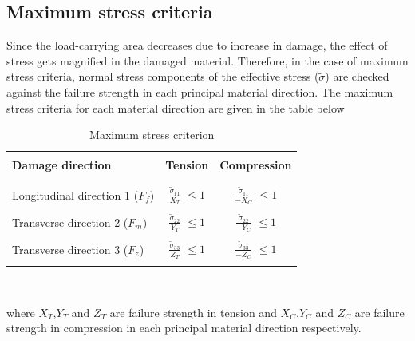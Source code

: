 \documentclass[12pt,openright,twoside]{report}
\begin{document}
\subsection{Maximum stress criteria}\label{Maximum stress criteria}
\indent\indent\indent  Since the load-carrying area decreases due to increase in damage, the effect of stress gets magnified in the damaged material. Therefore, in the case of maximum stress criteria, normal stress components of the effective stress ($\tilde{\sigma}$) are checked against the failure strength in each principal material direction. The maximum stress criteria \citep{jiang2018evaluations} for each material direction are given in the table below 
\begin{table}[htbp]
  \begin{center}
     \begin{tabular}{l  c  c} 
     \hline
     \\
      \textbf{Damage direction} \;\;& \textbf{Tension} \;& \textbf{Compression}\\
      \\
      \hline
      \\
      Longitudinal direction 1 ($F_{f}$) & \Large{$\frac{\tilde{\sigma}_{11}}{X_{T}} $}\small{ $\leq 1$} & \Large{$\frac{\tilde{\sigma}_{11}}{-X_{C}} $}\small{ $\leq 1$} \\
      \\
      Transverse direction 2 ($F_{m}$)  &  \Large{$\frac{\tilde{\sigma}_{22}}{Y_{T}} $}\small{ $\leq 1$}  & \Large{$\frac{\tilde{\sigma}_{22}}{-Y_{C}} $}\small{ $\leq 1$}\\
      \\
      Transverse direction 3 ($F_{z}$) &  \Large{$\frac{\tilde{\sigma}_{33}}{Z_{T}} $}\small{ $\leq 1$}  &   \Large{$\frac{\tilde{\sigma}_{33}}{-Z_{C}} $}\small{ $\leq 1$}\\
       \\
       \hline
    \end{tabular}
    \\
    \caption{Maximum stress criterion}
    \label{tab:Maximum stress criterion}
  \end{center}
\end{table}
\FloatBarrier
where $X_{T}$,$ Y_{T} $ and $Z_{T}$ are failure strength in tension and $X_{C}$,$ Y_{C} $ and $Z_{C}$ are failure strength in compression in each principal material direction respectively.
\end{document}
